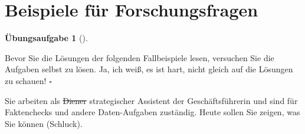 \documentclass[
  letterpaper,
  twoside,
  open=any]{scrbook}
\theoremstyle{definition}
\theoremstyle{definition}
\newtheorem{exercise}{Übungsaufgabe}[chapter]
\theoremstyle{definition}
\theoremstyle{remark}
\begin{document}
\section{Beispiele für
Forschungsfragen}\label{beispiele-fuxfcr-forschungsfragen}

\begin{exercise}[]\protect\hypertarget{exr-fallbsps}{}\label{exr-fallbsps}

Bevor Sie die Lösungen der folgenden Fallbeispiele lesen, versuchen Sie
die Aufgaben selbst zu lösen. Ja, ich weiß, es ist hart, nicht gleich
auf die Lösungen zu schauen! \(\square\)

\end{exercise}

Sie arbeiten als \st{Diener} strategischer Assistent der
Geschäftsführerin und sind für Faktenchecks und andere Daten-Aufgaben
zuständig. Heute sollen Sie zeigen, was Sie können (Schluck).
\end{document}
